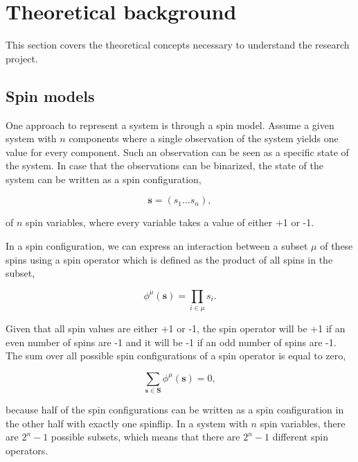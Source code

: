 \section{Theoretical background}

This section covers the theoretical concepts necessary to understand the research project.

\subsection{Spin models}

One approach to represent a system is through a spin model. Assume a given system with $n$ components where a single observation of the system yields one value for every component.
Such an observation can be seen as a specific state of the system.
In case that the observations can be binarized, the state of the system can be written as a spin configuration,

\begin{equation}
    \mathbf{s} = (s_1 \dots s_n),
\end{equation}

\noindent
of $n$ spin variables, where every variable takes a value of either +1 or -1.

\noindent
In a spin configuration, we can express an interaction between a subset $\mu$ of these spins using a spin operator which is defined as the product of all spins in the subset,

\begin{equation}\label{eq:spin_op}
    \phi^\mu(\mathbf{s}) = \prod_{i \in \mu} s_i.
\end{equation}

\noindent
Given that all spin values are either +1 or -1, the spin operator will be +1 if an even number of spins are -1 and it will be -1 if an odd number of spins are -1.
The sum over all possible spin configurations of a spin operator is equal to zero,

\begin{equation}\label{eq:sum_over_conf}
    \sum_{\mathbf{s} \in \mathbf{S}} \phi^\mu(\mathbf{s}) = 0,
\end{equation}

\noindent
because half of the spin configurations can be written as a spin configuration in the other half with exactly one spinflip.
In a system with $n$ spin variables, there are $2^n - 1$ possible subsets, which means that there are $2^n - 1$ different spin operators.

